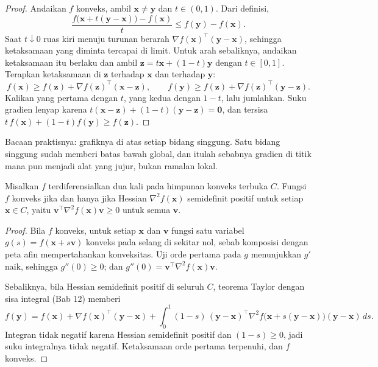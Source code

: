 \begin{proof}
Andaikan $f$ konveks, ambil $\mathbf{x}\ne\mathbf{y}$ dan $t\in(0,1)$. Dari definisi,
\[
  \frac{f\bigl(\mathbf{x}+t(\mathbf{y}-\mathbf{x})\bigr)-f(\mathbf{x})}{t}
  \le f(\mathbf{y})-f(\mathbf{x}).
\]
Saat $t\downarrow0$ ruas kiri menuju turunan berarah
$\nabla f(\mathbf{x})^{\top}(\mathbf{y}-\mathbf{x})$, sehingga ketaksamaan yang diminta
tercapai di limit. Untuk arah sebaliknya, andaikan ketaksamaan itu berlaku dan ambil
$\mathbf{z}=t\mathbf{x}+(1-t)\mathbf{y}$ dengan $t\in[0,1]$. Terapkan ketaksamaan di
$\mathbf{z}$ terhadap $\mathbf{x}$ dan terhadap $\mathbf{y}$:
\[
  f(\mathbf{x})\ge f(\mathbf{z})+\nabla f(\mathbf{z})^{\top}(\mathbf{x}-\mathbf{z}),
  \qquad
  f(\mathbf{y})\ge f(\mathbf{z})+\nabla f(\mathbf{z})^{\top}(\mathbf{y}-\mathbf{z}).
\]
Kalikan yang pertama dengan $t$, yang kedua dengan $1-t$, lalu jumlahkan. Suku gradien
lenyap karena $t(\mathbf{x}-\mathbf{z})+(1-t)(\mathbf{y}-\mathbf{z})=\mathbf{0}$, dan
tersisa $t\,f(\mathbf{x})+(1-t)f(\mathbf{y})\ge f(\mathbf{z})$.
\end{proof}

Bacaan praktisnya: grafiknya di atas setiap bidang singgung. Satu bidang singgung sudah
memberi batas bawah global, dan itulah sebabnya gradien di titik mana pun menjadi alat
yang jujur, bukan ramalan lokal.

\begin{teorema}
Misalkan $f$ terdiferensialkan dua kali pada himpunan konveks terbuka $C$. Fungsi $f$
konveks jika dan hanya jika Hessian $\nabla^{2}f(\mathbf{x})$ semidefinit positif untuk
setiap $\mathbf{x}\in C$, yaitu
$\mathbf{v}^{\top}\nabla^{2}f(\mathbf{x})\mathbf{v}\ge0$ untuk semua $\mathbf{v}$.
\end{teorema}

\begin{proof}
Bila $f$ konveks, untuk setiap $\mathbf{x}$ dan $\mathbf{v}$ fungsi satu variabel
$g(s)=f(\mathbf{x}+s\mathbf{v})$ konveks pada selang di sekitar nol, sebab komposisi
dengan peta afin mempertahankan konveksitas. Uji orde pertama pada $g$ menunjukkan $g'$
naik, sehingga $g''(0)\ge0$; dan $g''(0)=\mathbf{v}^{\top}\nabla^{2}f(\mathbf{x})
\mathbf{v}$.

Sebaliknya, bila Hessian semidefinit positif di seluruh $C$, teorema Taylor dengan sisa
integral (Bab 12) memberi
\[
  f(\mathbf{y})=f(\mathbf{x})+\nabla f(\mathbf{x})^{\top}(\mathbf{y}-\mathbf{x})
  +\int_{0}^{1}(1-s)\,(\mathbf{y}-\mathbf{x})^{\top}
   \nabla^{2}f\bigl(\mathbf{x}+s(\mathbf{y}-\mathbf{x})\bigr)(\mathbf{y}-\mathbf{x})\,ds .
\]
Integran tidak negatif karena Hessian semidefinit positif dan $(1-s)\ge0$, jadi suku
integralnya tidak negatif. Ketaksamaan orde pertama terpenuhi, dan $f$ konveks.
\end{proof}

